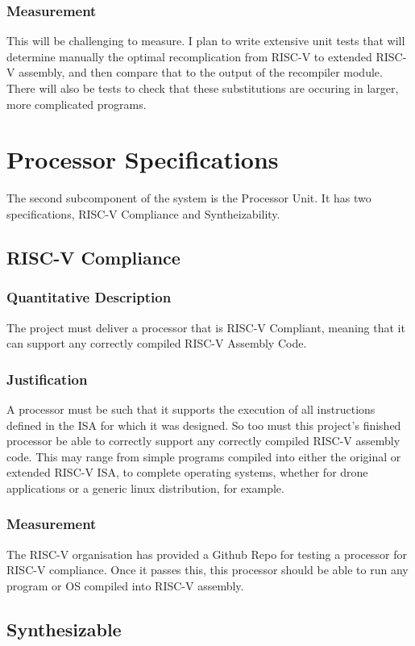 \documentclass[11pt, oneside]{article}      %
\begin{document}
\subsubsection{Measurement}
This will be challenging to measure. I plan to write extensive unit tests that will determine manually the optimal recomplication from RISC-V to extended RISC-V assembly, and then compare that to the output of the recompiler module. There will also be tests to check that these substitutions are occuring in larger, more complicated programs.

\section{Processor Specifications}
The second subcomponent of the system is the Processor Unit. It has two specifications, RISC-V Compliance and Syntheizability.

\subsection{RISC-V Compliance} \label{subsection:riscvCompliance}
\subsubsection{Quantitative Description}
The project must deliver a processor that is RISC-V Compliant, meaning that it can support any correctly compiled RISC-V Assembly Code.
\subsubsection{Justification}
A processor must be such that it supports the execution of all instructions defined in the \ac{ISA} for which it was designed. So too must this project's finished processor be able to correctly support any correctly compiled RISC-V assembly code. This may range from simple programs compiled into either the original or extended RISC-V \ac{ISA}, to complete operating systems, whether for drone applications or a generic linux distribution, for example. 
\subsubsection{Measurement}
The RISC-V organisation has provided a Github Repo for testing a processor for RISC-V compliance.\cite{Compliance} Once it passes this, this processor should be able to run any program or OS compiled into RISC-V assembly.

\subsection{Synthesizable}
\end{document}
